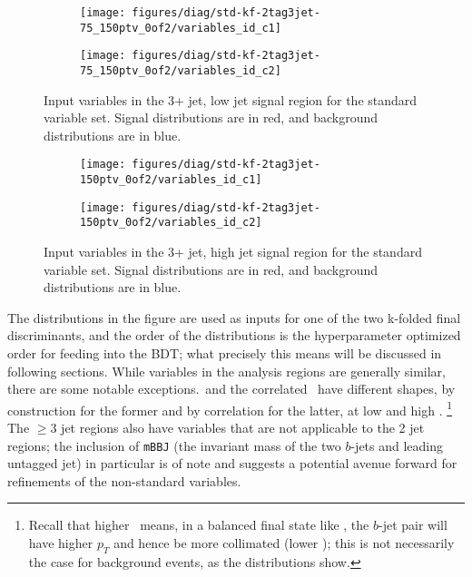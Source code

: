 \begin{figure}[!htbp]\captionsetup{justification=centering}
  \centering
\begin{subfigure}[t]{0.49\textwidth}\centering\texttt{[image: figures/diag/std-kf-2tag3jet-75\_150ptv\_0of2/variables\_id\_c1]}\end{subfigure}
\begin{subfigure}[t]{0.49\textwidth}\centering\texttt{[image: figures/diag/std-kf-2tag3jet-75\_150ptv\_0of2/variables\_id\_c2]}\end{subfigure}
  \caption{Input variables in the 3+ jet, low jet signal region for the standard variable set.  Signal distributions are in red, and background distributions are in blue.}
  \label{fig:std-kf3jet-75_150ptv-inputs}
\end{figure}

\begin{figure}[!htbp]\captionsetup{justification=centering}
  \centering
\begin{subfigure}[t]{0.49\textwidth}\centering\texttt{[image: figures/diag/std-kf-2tag3jet-150ptv\_0of2/variables\_id\_c1]}\end{subfigure}
\begin{subfigure}[t]{0.49\textwidth}\centering\texttt{[image: figures/diag/std-kf-2tag3jet-150ptv\_0of2/variables\_id\_c2]}\end{subfigure}
  \caption{Input variables in the 3+ jet, high jet signal region for the standard variable set.  Signal distributions are in red, and background distributions are in blue.}
  \label{fig:std-kf3jet-150ptv-inputs}
\end{figure}
The distributions in the figure are used as inputs for one of the two k-folded final discriminants, and the order of the distributions is the hyperparameter optimized order for feeding into the BDT; what precisely this means will be discussed in following sections.  While variables in the analysis regions are generally similar, there are some notable exceptions.  \ptv\,and the correlated \drbb\, have different shapes, by construction for the former and by correlation for the latter, at low and high \ptv.  \footnote{Recall that higher \ptv\, means, in a balanced final state like \ZH, the $b$-jet pair will have higher $p_T$ and hence be more collimated (lower \drbb); this is not necessarily the case for background events, as the distributions show.}  The $\ge3$ jet regions also have variables that are not applicable to the 2 jet regions; the inclusion of \texttt{mBBJ} (the invariant mass of the two $b$-jets and leading untagged jet) in particular is of note and suggests a potential avenue forward for refinements of the non-standard variables.

